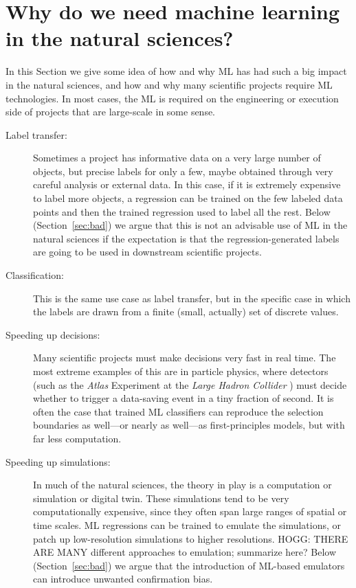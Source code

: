 \documentclass[11pt]{article}
\newcommand{\sectionname}{Section}
\begin{document}
\section{Why do we need machine learning in the natural sciences?}
In this \sectionname{} we give some idea of how and why ML has had such a big impact in the natural sciences, and how and why many scientific projects require ML technologies.
In most cases, the ML is required on the engineering or execution side of projects that are large-scale in some sense.
\begin{description}
  \item[Label transfer:] Sometimes a project has informative data on a very large number of objects, but precise labels for only a few, maybe obtained through very careful analysis or external data.
  In this case, if it is extremely expensive to label more objects, a regression can be trained on the few labeled data points and then the trained regression used to label all the rest.
  Below (\sectionname~\ref{sec:bad}) we argue that this is not an advisable use of ML in the natural sciences if the expectation is that the regression-generated labels are going to be used in downstream scientific projects.
  \item[Classification:] This is the same use case as label transfer, but in the specific case in which the labels are drawn from a finite (small, actually) set of discrete values.
  \item[Speeding up decisions:] Many scientific projects must make decisions very fast in real time.
  The most extreme examples of this are in particle physics, where detectors (such as the \textsl{Atlas} Experiment \cite{atlas} at the \textsl{Large Hadron Collider} \cite{lhc}) must decide whether to trigger a data-saving event in a tiny fraction of second.
  It is often the case that trained ML classifiers can reproduce the selection boundaries as well---or nearly as well---as first-principles models, but with far less computation.
  \item[Speeding up simulations:] In much of the natural sciences, the theory in play is a computation or simulation or digital twin.
  These simulations tend to be very computationally expensive, since they often span large ranges of spatial or time scales.
  ML regressions can be trained to emulate the simulations, or patch up low-resolution simulations to higher resolutions.
  HOGG: THERE ARE MANY different approaches to emulation; summarize here?
  Below (\sectionname~\ref{sec:bad}) we argue that the introduction of ML-based emulators can introduce unwanted confirmation bias.

\end{description}
\end{document}
